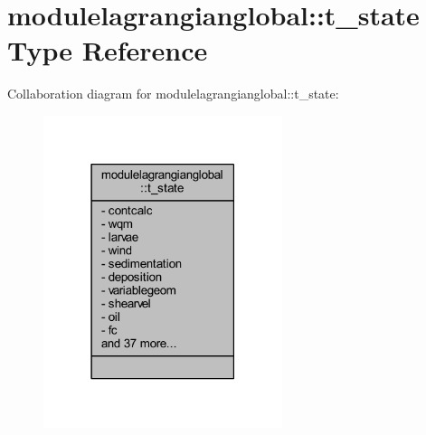 \hypertarget{structmodulelagrangianglobal_1_1t__state}{}\section{modulelagrangianglobal\+:\+:t\+\_\+state Type Reference}
\label{structmodulelagrangianglobal_1_1t__state}


Collaboration diagram for modulelagrangianglobal\+:\+:t\+\_\+state\+:\nopagebreak
\begin{figure}[H]
\begin{center}
\leavevmode
\includegraphics[width=198pt]{structmodulelagrangianglobal_1_1t__state__coll__graph}
\end{center}
\end{figure}
